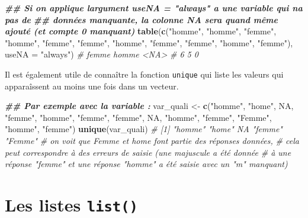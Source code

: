 \documentclass[
]{book}
\newenvironment{Shaded}{\begin{snugshade}}{\end{snugshade}}
\newcommand{\AttributeTok}[1]{\textcolor[rgb]{0.13,0.29,0.53}{#1}}
\newcommand{\CommentTok}[1]{\textcolor[rgb]{0.56,0.35,0.01}{\textit{#1}}}
\newcommand{\ConstantTok}[1]{\textcolor[rgb]{0.56,0.35,0.01}{#1}}
\newcommand{\DocumentationTok}[1]{\textcolor[rgb]{0.56,0.35,0.01}{\textbf{\textit{#1}}}}
\newcommand{\FunctionTok}[1]{\textcolor[rgb]{0.13,0.29,0.53}{\textbf{#1}}}
\newcommand{\NormalTok}[1]{#1}
\newcommand{\OtherTok}[1]{\textcolor[rgb]{0.56,0.35,0.01}{#1}}
\newcommand{\StringTok}[1]{\textcolor[rgb]{0.31,0.60,0.02}{#1}}
\begin{document}
\begin{Shaded}
\begin{Highlighting}[]
\DocumentationTok{\#\# Si on applique l\textquotesingle{}argument useNA = "always" a une variable qui n\textquotesingle{}a pas de }
\DocumentationTok{\#\# données manquante, la colonne NA sera quand même ajouté (et compte 0 manquant)}
\FunctionTok{table}\NormalTok{(}\FunctionTok{c}\NormalTok{(}\StringTok{"homme"}\NormalTok{, }\StringTok{"homme"}\NormalTok{, }\StringTok{"femme"}\NormalTok{, }\StringTok{"homme"}\NormalTok{, }\StringTok{"femme"}\NormalTok{, }\StringTok{"femme"}\NormalTok{, }
        \StringTok{"homme"}\NormalTok{, }\StringTok{"femme"}\NormalTok{, }\StringTok{"femme"}\NormalTok{, }\StringTok{"homme"}\NormalTok{, }\StringTok{"femme"}\NormalTok{), }
      \AttributeTok{useNA =} \StringTok{"always"}\NormalTok{)}
\CommentTok{\# femme homme  \textless{}NA\textgreater{} }
\CommentTok{\#     6     5     0}
\end{Highlighting}
\end{Shaded}

Il est également utile de connaître la fonction \texttt{unique} qui liste les valeurs qui apparaîssent au moins une fois dans un vecteur.

\begin{Shaded}
\begin{Highlighting}[]
\DocumentationTok{\#\# Par exemple avec la variable : }
\NormalTok{var\_quali }\OtherTok{\textless{}{-}} \FunctionTok{c}\NormalTok{(}\StringTok{"homme"}\NormalTok{, }\StringTok{"home"}\NormalTok{, }\ConstantTok{NA}\NormalTok{, }\StringTok{"femme"}\NormalTok{, }\StringTok{"homme"}\NormalTok{, }\StringTok{"femme"}\NormalTok{, }\StringTok{"femme"}\NormalTok{, }\ConstantTok{NA}\NormalTok{, }
                \StringTok{"homme"}\NormalTok{, }\StringTok{"femme"}\NormalTok{, }\StringTok{"Femme"}\NormalTok{, }\StringTok{"homme"}\NormalTok{, }\StringTok{"femme"}\NormalTok{)}
\FunctionTok{unique}\NormalTok{(var\_quali)}
\CommentTok{\# [1] "homme" "home"  NA      "femme" "Femme"}
\CommentTok{\# on voit que Femme et home font partie des réponses données, }
\CommentTok{\# cela peut correspondre à des erreurs de saisie (une majuscule a été donnée}
\CommentTok{\# à une réponse "femme" et une réponse "homme" a été saisie avec un "m" manquant)}
\end{Highlighting}
\end{Shaded}

\section{\texorpdfstring{Les listes \texttt{list()}}{Les listes list()}}\label{les-listes-list}
\end{document}
